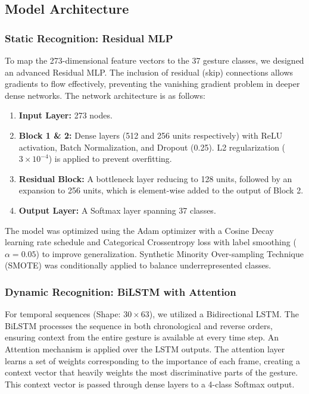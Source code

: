 \documentclass[10pt,twocolumn,letterpaper]{article}
\begin{document}
\subsection{Model Architecture}

\subsubsection{Static Recognition: Residual MLP}
To map the 273-dimensional feature vectors to the 37 gesture classes, we designed an advanced Residual MLP. The inclusion of residual (skip) connections allows gradients to flow effectively, preventing the vanishing gradient problem in deeper dense networks.
The network architecture is as follows:
\begin{enumerate}
    \item \textbf{Input Layer:} 273 nodes.
    \item \textbf{Block 1 \& 2:} Dense layers (512 and 256 units respectively) with ReLU activation, Batch Normalization, and Dropout (0.25). L2 regularization ($3 \times 10^{-4}$) is applied to prevent overfitting.
    \item \textbf{Residual Block:} A bottleneck layer reducing to 128 units, followed by an expansion to 256 units, which is element-wise added to the output of Block 2.
    \item \textbf{Output Layer:} A Softmax layer spanning 37 classes.
\end{enumerate}
The model was optimized using the Adam optimizer with a Cosine Decay learning rate schedule and Categorical Crossentropy loss with label smoothing ($\alpha=0.05$) to improve generalization. Synthetic Minority Over-sampling Technique (SMOTE) was conditionally applied to balance underrepresented classes.

\subsubsection{Dynamic Recognition: BiLSTM with Attention}
For temporal sequences (Shape: $30 \times 63$), we utilized a Bidirectional LSTM. The BiLSTM processes the sequence in both chronological and reverse orders, ensuring context from the entire gesture is available at every time step.
An Attention mechanism is applied over the LSTM outputs. The attention layer learns a set of weights corresponding to the importance of each frame, creating a context vector that heavily weights the most discriminative parts of the gesture. This context vector is passed through dense layers to a 4-class Softmax output.
\end{document}
